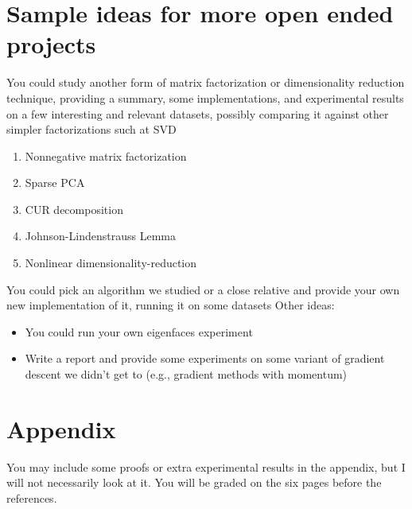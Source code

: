 \documentclass{article}
\begin{document}
\section{Sample ideas for more open ended projects}

You could study another form of matrix factorization or dimensionality reduction technique, providing a summary, some implementations, and experimental results on a few interesting and relevant datasets, possibly comparing it against other simpler factorizations such at SVD
\begin{enumerate}
	\item Nonnegative matrix factorization 
	\item Sparse PCA 
	\item CUR decomposition
	\item Johnson-Lindenstrauss Lemma
	\item Nonlinear dimensionality-reduction
\end{enumerate}

You could pick an algorithm we studied or a close relative and provide your own new implementation of it, running it on some datasets 
Other ideas:
\begin{itemize}
\item You could run your own eigenfaces experiment
\item Write a report and provide some experiments on some variant of gradient descent we didn't get to (e.g., gradient methods with momentum)
\end{itemize}





	
	
	
	
	
	
	\appendix
	
	\section{Appendix}
	
	You may include some proofs or extra experimental results in the appendix, but I will not necessarily look at it. You will be graded on the six pages before the references.
	
\end{document}
